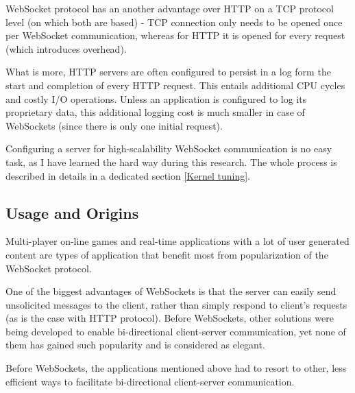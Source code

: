 \documentclass{uvamscse}
\begin{document}
WebSocket protocol has an another advantage over HTTP on a TCP protocol level (on which both are based) - TCP connection only needs to be opened once per WebSocket communication, whereas for HTTP it is opened for every request (which introduces overhead).

What is more, HTTP servers are often configured to persist in a log form the start and completion of every HTTP request. This entails additional CPU cycles and costly I/O operations. Unless an application is configured to log its proprietary data, this additional logging cost is much smaller in case of WebSockets (since there is only one initial request).

Configuring a server for high-scalability WebSocket communication is no easy task, as I have learned the hard way during this research. The whole process is described in details in a dedicated section \ref{Kernel tuning}.

\subsection{Usage and Origins}\label{Client-Server Communication Improvements}

Multi-player on-line games and real-time applications with a lot of user generated content are types of application that benefit most from popularization of the WebSocket protocol.

One of the biggest advantages of WebSockets is that the server can easily send unsolicited messages to the client, rather than simply respond to client's requests (as is the case with HTTP protocol). Before WebSockets, other solutions were being developed to enable bi-directional client-server communication, yet none of them has gained such popularity and is considered as elegant.

Before WebSockets, the applications mentioned above had to resort to other, less efficient ways to facilitate bi-directional client-server communication.
\end{document}
